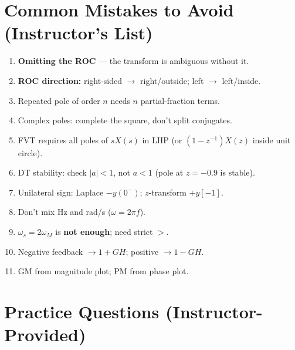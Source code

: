 \documentclass[11pt]{article}
\begin{document}
\section{Common Mistakes to Avoid (Instructor's List)}
\begin{enumerate}
  \item \textbf{Omitting the ROC} --- the transform is ambiguous without it.
  \item \textbf{ROC direction:} right-sided $\to$ right/outside; left $\to$ left/inside.
  \item Repeated pole of order $n$ needs $n$ partial-fraction terms.
  \item Complex poles: complete the square, don't split conjugates.
  \item FVT requires all poles of $sX(s)$ in LHP (or $(1 - z^{-1})X(z)$ inside unit circle).
  \item DT stability: check $|a| < 1$, not $a < 1$ (pole at $z = -0.9$ is stable).
  \item Unilateral sign: Laplace $-y(0^-)$; $z$-transform $+y[-1]$.
  \item Don't mix Hz and rad/s ($\omega = 2\pi f$).
  \item $\omega_s = 2\omega_M$ is \textbf{not enough}; need strict $>$.
  \item Negative feedback $\to 1 + GH$; positive $\to 1 - GH$.
  \item GM from magnitude plot; PM from phase plot.
\end{enumerate}

\section{Practice Questions (Instructor-Provided)}
\end{document}
